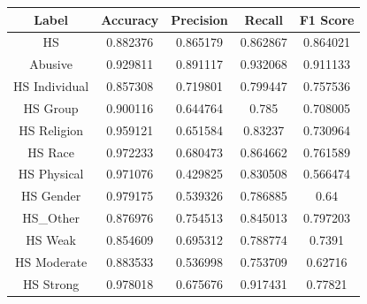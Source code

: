 \documentclass[journal,article,submit,pdftex,moreauthors]{Definitions/mdpi}
\begin{document}
\begin{table}[H] 
\begin{tabularx}{\textwidth}{CCCCC}
\toprule
\textbf{Label}	& \textbf{Accuracy}	& \textbf{Precision} & \textbf{Recall} & \textbf{F1 Score} \\
\midrule
HS	& 0.882376		& 0.865179		& 0.862867			& 0.864021\\
Abusive	& 0.929811		& 0.891117      & 0.932068			& 0.911133\\
HS Individual	& 0.857308		& 0.719801          & 0.799447		& 0.757536\\
HS Group	& 0.900116			& 0.644764         & 0.785			& 0.708005\\
HS Religion	& 0.959121			& 0.651584          & 0.83237		& 0.730964\\
HS Race & 0.972233		& 0.680473          & 0.864662		& 0.761589\\
HS Physical	& 0.971076		& 0.429825          & 0.830508			& 0.566474\\
HS Gender	& 0.979175		& 0.539326          & 0.786885		& 0.64\\
HS_Other & 0.876976		& 0.754513          & 0.845013		& 0.797203\\
HS Weak	& 0.854609		& 0.695312          & 0.788774			& 0.7391
\\
HS Moderate& 0.883533		& 0.536998          & 0.753709		& 0.62716\\
HS Strong	& 0.978018		& 0.675676          & 0.917431		& 0.77821\\
\bottomrule
\end{tabularx}
\end{table}
\end{document}
